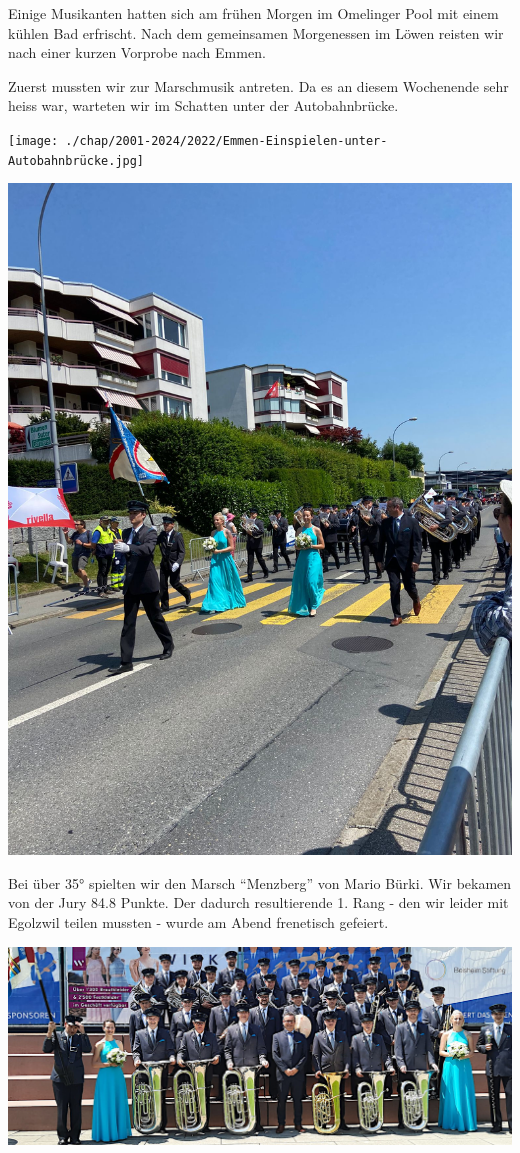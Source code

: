 \begin{history}

    Einige Musikanten hatten sich am frühen Morgen im Omelinger Pool mit einem
    kühlen Bad erfrischt. Nach dem gemeinsamen Morgenessen im Löwen reisten wir
    nach einer kurzen Vorprobe nach Emmen.

    Zuerst mussten wir zur Marschmusik antreten. Da es an diesem Wochenende sehr
    heiss war, warteten wir im Schatten unter der Autobahnbrücke.

    \begin{MulticolFigure}
        \centering
        \texttt{[image: ./chap/2001-2024/2022/Emmen-Einspielen-unter-Autobahnbrücke.jpg]}
    \end{MulticolFigure}

    \begin{MulticolFigure}
        \centering
        \includegraphics[width=0.6\linewidth]{./chap/2001-2024/2022/Emmen-Marschmusik.jpg}
    \end{MulticolFigure}

    Bei über 35° spielten wir den Marsch \enquote{Menzberg} von Mario Bürki. Wir
    bekamen von der Jury 84.8 Punkte. Der dadurch resultierende 1. Rang - den
    wir leider mit Egolzwil teilen mussten - wurde am Abend frenetisch gefeiert.

    \begin{MulticolFigure}
        \centering
        \includegraphics[width=0.93\linewidth]{./chap/2001-2024/2022/Emmen-Gesamtfoto.jpg}
    \end{MulticolFigure}


\end{history}
